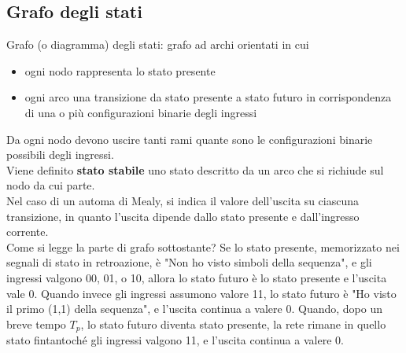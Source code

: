\documentclass{article}
\begin{document}
\subsection{Grafo degli stati}
Grafo (o diagramma) degli stati: grafo ad archi orientati in cui
\begin{itemize}
    \item ogni nodo rappresenta lo stato presente
    \item ogni arco una transizione da stato presente a stato futuro in corrispondenza di una o più configurazioni binarie degli ingressi
\end{itemize}
Da ogni nodo devono uscire tanti rami quante sono le configurazioni binarie possibili degli ingressi.\\
Viene definito \textbf{\color{blue} stato stabile} uno stato descritto da un arco che si richiude sul nodo da cui parte.\\
Nel caso di un automa di Mealy, si indica il valore dell’uscita su ciascuna transizione, in quanto l’uscita dipende dallo stato presente e dall’ingresso corrente.
\vspace{0.2cm}\\
Come si legge la parte di grafo sottostante? Se lo stato presente, memorizzato nei segnali di stato in retroazione, è "Non ho visto simboli della sequenza", e gli ingressi valgono 00, 01, o 10, allora lo stato futuro è lo stato presente e l’uscita vale 0. Quando invece gli ingressi assumono valore 11, lo stato futuro è "Ho visto il primo (1,1) della sequenza", e l’uscita continua a valere 0. Quando, dopo un breve tempo $T_p$, lo stato futuro diventa stato presente, la rete rimane in quello stato fintantoché gli ingressi valgono 11, e l’uscita continua a valere 0.
\end{document}
